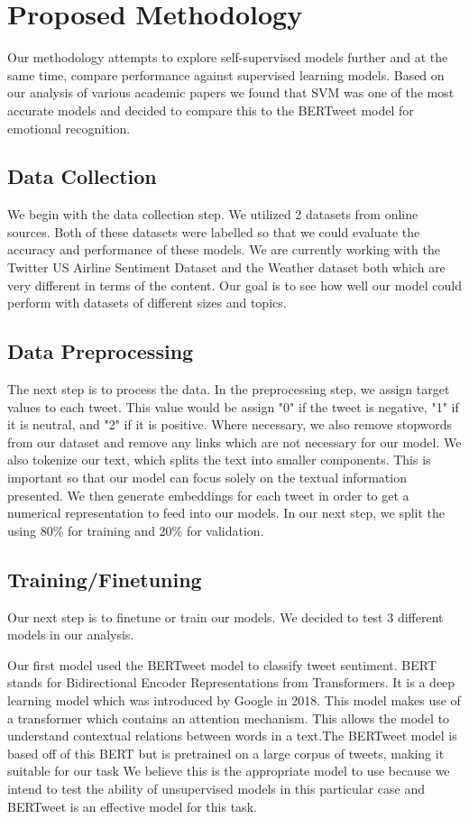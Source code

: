 \documentclass[conference]{IEEEtran}
\begin{document}
\section{Proposed Methodology}

Our methodology attempts to explore self-supervised models further and at the same time, compare performance against supervised learning models. Based on our analysis of various academic papers we found that SVM was one of the most accurate models and decided to compare this to the BERTweet model for emotional recognition. 

\subsection{Data Collection}

We begin with the data collection step. 
We utilized 2 datasets from online sources. Both of these datasets were labelled so that we could evaluate the accuracy and performance of these models.
We are currently working with the Twitter US Airline Sentiment Dataset and the Weather dataset both which are very different in terms of the content. 
Our goal is to see how well our model could perform with datasets of different sizes and topics. 

\subsection{Data Preprocessing}
The next step is to process the data. 
In the preprocessing step, we assign target values to each tweet. This value would be assign "0" if the tweet is negative, "1" if it is neutral, and "2" if it is positive.  Where necessary, we also remove stopwords from our dataset and remove any links which are not necessary for our model. We also tokenize our text, which splits the text into smaller components. This is important so that our model can focus solely on the textual information presented. We then generate embeddings for each tweet in order to get a numerical representation to feed into our models. In our next step, we split the using 80\%  for training and 20\% for validation.


\subsection{Training/Finetuning}
Our next step is to finetune or train our models. We decided to test 3 different models in our analysis.

Our first model used the BERTweet model to classify tweet sentiment. BERT stands for Bidirectional Encoder Representations from Transformers. It is a deep learning model which was introduced by Google in 2018. This model makes use of a transformer which contains an attention mechanism. This allows the model to understand contextual relations between words in a text\cite{b17}.The BERTweet model is based off of this BERT but is pretrained on a large corpus of tweets, making it suitable for our task  \cite{b18}
We believe this is the appropriate model to use because we intend to test the ability of unsupervised models in this particular case and BERTweet is an effective model for this task.
\end{document}
